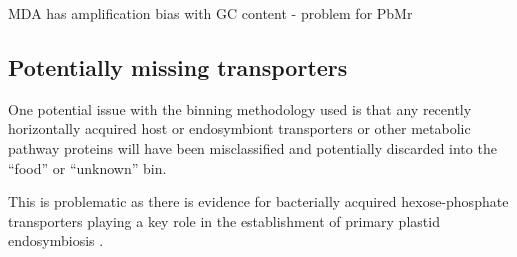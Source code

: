 




MDA has amplification bias with GC content - problem for PbMr \citep{Macaulay2014}


\subsection{Potentially missing transporters}

One potential issue with the binning methodology used is
that any recently horizontally acquired host or endosymbiont 
transporters or other metabolic pathway proteins will have been misclassified
and potentially discarded into the ``food'' or ``unknown'' bin.

This is problematic as there is evidence for bacterially acquired 
hexose-phosphate transporters playing a key role in the 
establishment of primary plastid endosymbiosis \citep{Price2012,Karkar2015a}.

